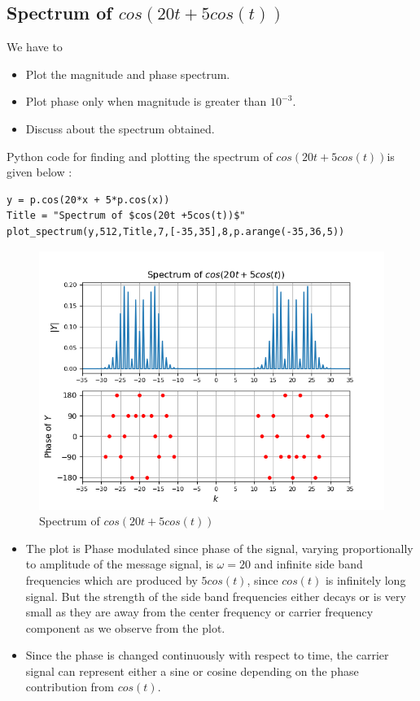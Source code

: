 \documentclass[11pt, a4paper]{article}
\begin{document}
    \subsection{Spectrum of $cos(20t +5cos(t))$}
    We have to
    \begin{itemize}
        \item Plot the magnitude and phase spectrum.
        \item Plot phase only when magnitude is greater than $10^{-3}$.
        \item Discuss about the spectrum obtained.
    \end{itemize}
    Python code for finding and plotting the spectrum of $cos(20t +5cos(t))$is given below :
    \begin{verbatim}
y = p.cos(20*x + 5*p.cos(x))
Title = "Spectrum of $cos(20t +5cos(t))$"
plot_spectrum(y,512,Title,7,[-35,35],8,p.arange(-35,36,5))
    \end{verbatim}
    \begin{figure}[!h]
        \centering
        \includegraphics[scale = 0.7]{Figure 7.png}
        \caption{Spectrum of $cos(20t +5cos(t))$}
        \label{fig:Figure 7}
    \end{figure}
    \begin{itemize}
        \item The plot is Phase modulated since phase of the signal, varying proportionally to amplitude of the message signal, is $\omega = 20$ and infinite side band frequencies which are produced by $5cos(t)$, since $cos(t)$ is infinitely long signal. But the strength of the side band frequencies either decays or is very small as they are away from the center frequency or carrier frequency component as we observe from the plot.
        \item Since the phase is changed continuously with respect to time, the carrier signal can represent either a sine or cosine depending on the phase contribution from $cos(t)$.
    \end{itemize}
\end{document}
